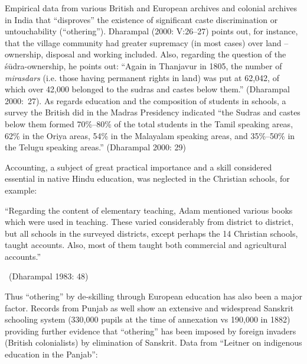 Empirical data from various British and European archives and colonial archives in India that “disproves” the existence of significant caste discrimination or untouchability (“othering”). Dharampal (2000: V:26–27) points out, for instance, that the village community had greater supremacy (in most cases) over land – ownership, disposal and working included. Also, regarding the question of the śūdra-ownership, he points out: “Again in Thanjavur in 1805, the number of \textit{mirasdars} (i.e. those having permanent rights in land) was put at 62,042, of which over 42,000 belonged to the sudras and castes below them.” (Dharampal 2000:~27). As regards education and the composition of students in schools, a survey the British did in the Madras Presidency indicated ``the Sudras and castes below them formed 70\%–80\% of the total students in the Tamil speaking areas, 62\% in the Oriya areas, 54\% in the Malayalam speaking areas, and 35\%–50\% in the Telugu speaking areas.” (Dharampal 2000: 29)

Accounting, a subject of great practical importance and a skill considered essential in native Hindu education, was neglected in the Christian schools, for example:

\eject

\begin{myquote}
“Regarding the content of elementary teaching, Adam mentioned various books which were used in teaching. These varied considerably from district to district, but all schools in the surveyed districts, except perhaps the 14 Christian schools, taught accounts. Also, most of them taught both commercial and agricultural accounts.” 

~\hfill (Dharampal 1983: 48)
\end{myquote}

Thus “othering” by de-skilling through European education has also been a major factor. Records from Punjab as well show an extensive and widespread Sanskrit schooling system (330,000 pupils at the time of annexation vs 190,000 in 1882) providing further evidence that “othering” has been imposed by foreign invaders (British colonialists) by elimination of Sanskrit. Data from “Leitner on indigenous education in the Panjab”:

